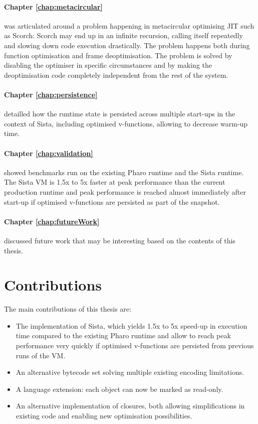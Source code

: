 \documentclass[a4paper,12pt,twoside]{../includes/ThesisStyle}
\begin{document}
\paragraph{Chapter \ref{chap:metacircular}} was articulated around a problem happening in metacircular optimising JIT such as Scorch: Scorch may end up in an infinite recursion, calling itself repeatedly and slowing down code execution drastically. The problem happens both during function optimisation and frame deoptimisation. The problem is solved by disabling the optimiser in specific circumstances and by making the deoptimisation code completely independent from the rest of the system.

\paragraph{Chapter \ref{chap:persistence}} detailled how the runtime state is persisted across multiple start-ups in the context of Sista, including optimised v-functions, allowing to decrease warm-up time. 

\paragraph{Chapter \ref{chap:validation}} showed benchmarks run on the existing Pharo runtime and the Sista runtime. The Sista VM is 1.5x to 5x faster at peak performance than the current production runtime and peak performance is reached almost immediately after start-up if optimised v-functions are persisted as part of the snapshot.

\paragraph{Chapter \ref{chap:futureWork}} discussed future work that may be interesting based on the contents of this thesis.

\section{Contributions}

The main contributions of this thesis are:
\begin{itemize}
	\item The implementation of Sista, which yields 1.5x to 5x speed-up in execution time compared to the existing Pharo runtime and allow to reach peak performance very quickly if optimised v-functions are persisted from previous runs of the VM.
	\item An alternative bytecode set solving multiple existing encoding limitations.
	\item A language extension: each object can now be marked as read-only.
	\item An alternative implementation of closures, both allowing simplifications in existing code and enabling new optimisation possibilities.
\end{itemize}
\end{document}
